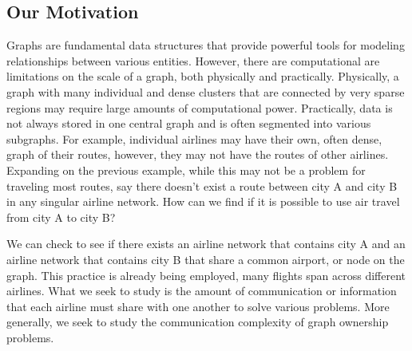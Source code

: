 \subsection{Our Motivation}Graphs are fundamental data structures that provide powerful tools for modeling relationships between various entities. However, there are computational are limitations on the scale of a graph, both physically and practically. Physically, a graph with many individual and dense clusters that are connected by very sparse regions may require large amounts of computational power. Practically, data is not always stored in one central graph and is often segmented into various subgraphs. For example, individual airlines may have their own, often dense, graph of their routes, however, they may not have the routes of other airlines.  Expanding on the previous example, while this may not be a problem for traveling most routes, say there doesn’t exist a route between city A and city B in any singular airline network. How can we find if it is possible to use air travel from city A to city B?


We can check to see if there exists an airline network that contains city A and an airline network that contains city B that share a common airport, or node on the graph. This practice is already being employed, many flights span across different airlines. What we seek to study is the amount of communication or information that each airline must share with one another to solve various problems. More generally, we seek to study the communication complexity of graph ownership problems.
